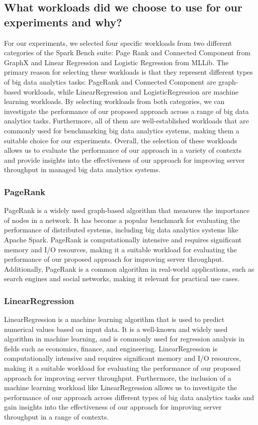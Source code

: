 \subsection{What workloads did we choose to use for our experiments and why?}
For our experiments, we selected four specific workloads from two
different categories of the Spark Bench suite: Page Rank and Connected
Component from GraphX and Linear Regression and Logistic Regression
from MLLib. The primary reason for selecting these workloads is that
they represent different types of big data analytics tasks: PageRank
and Connected Component are graph-based workloads, while
LinearRegression and LogisticRegression are machine learning
workloads. By selecting workloads from both categories, we can
investigate the performance of our proposed approach across a range of
big data analytics tasks. Furthermore, all of them are
well-established workloads that are commonly used for benchmarking big
data analytics systems, making them a suitable choice for our
experiments. Overall, the selection of these workloads allows us to
evaluate the performance of our approach in a variety of contexts and
provide insights into the effectiveness of our approach for improving
server throughput in managed big data analytics systems.

\subsubsection{PageRank}
PageRank is a widely used graph-based algorithm that measures the
importance of nodes in a network. It has become a popular benchmark
for evaluating the performance of distributed systems, including big
data analytics systems like Apache Spark. PageRank is computationally
intensive and requires significant memory and I/O resources, making it
a suitable workload for evaluating the performance of our proposed
approach for improving server throughput. Additionally, PageRank is a
common algorithm in real-world applications, such as search engines
and social networks, making it relevant for practical use cases.

\subsubsection{LinearRegression}
LinearRegression is a machine learning algorithm that is used to
predict numerical values based on input data. It is a well-known and
widely used algorithm in machine learning, and is commonly used for
regression analysis in fields such as economics, finance, and
engineering. LinearRegression is computationally intensive and
requires significant memory and I/O resources, making it a suitable
workload for evaluating the performance of our proposed approach for
improving server throughput. Furthermore, the inclusion of a machine
learning workload like LinearRegression allows us to investigate the
performance of our approach across different types of big data
analytics tasks and gain insights into the effectiveness of our
approach for improving server throughput in a range of contexts.

